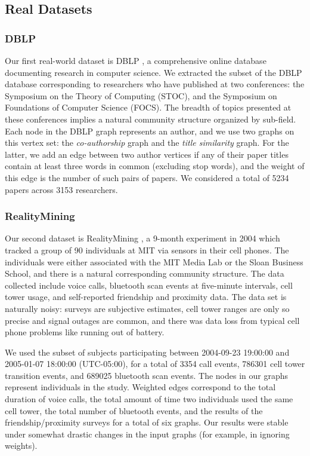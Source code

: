 \documentclass{article}
\begin{document}
\subsection{Real Datasets} 
\subsubsection{DBLP}
Our first real-world dataset is DBLP \cite{Ley02}, a comprehensive online
database documenting research in computer science. We extracted the subset of
the DBLP database corresponding to researchers who have published at two
conferences: the Symposium on the Theory of Computing (STOC), and the Symposium
on Foundations of Computer Science (FOCS). The breadth of topics presented at
these conferences implies a natural community structure organized by sub-field.
Each node in the DBLP graph represents an author, and we use two graphs on this
vertex set: the {\em co-authorship} graph and the {\em title similarity} graph.
For the latter, we add an edge between two author vertices if any of their
paper titles contain at least three words in common (excluding stop words), and
the weight of this edge is the number of such pairs of papers. We considered a
total of 5234 papers across 3153 researchers.

\subsubsection{RealityMining}
Our second dataset is RealityMining \cite{RealityMining}, a 9-month experiment
in 2004 which tracked a group of 90 individuals at MIT via sensors in their
cell phones. The individuals were either associated with the MIT Media Lab or
the Sloan Business School, and there is a natural corresponding community
structure. The data collected include voice calls, bluetooth scan events at
five-minute intervals, cell tower usage, and self-reported friendship and
proximity data. The data set is naturally noisy: surveys are subjective
estimates, cell tower ranges are only so precise and signal outages are common,
and there was data loss from typical cell phone problems like running out of
battery. 

We used the subset of subjects participating between 2004-09-23 19:00:00 and
2005-01-07 18:00:00 (UTC-05:00), for a total of 3354 call events, 786301 cell
tower transition events, and 689025 bluetooth scan events. The nodes in our
graphs represent individuals in the study. Weighted edges correspond to the
total duration of voice calls, the total amount of time two individuals used
the same cell tower, the total number of bluetooth events, and the results of
the friendship/proximity surveys for a total of six graphs. Our results were
stable under somewhat drastic changes in the input graphs (for example, in
ignoring weights).
\end{document}
